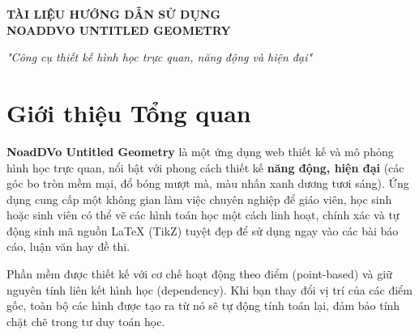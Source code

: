\documentclass[12pt,a4paper]{article}
\date{}
\begin{document}

\begin{center}
    \vspace*{2cm}
    {\Huge \textbf{\color{dark} TÀI LIỆU HƯỚNG DẪN SỬ DỤNG}}\\[0.5cm]
    {\Huge \textbf{\color{primary} NOADDVO UNTITLED GEOMETRY}}\\[1.5cm]
    
    \begin{infobox}
    \centering
    \textit{"Công cụ thiết kế hình học trực quan, năng động và hiện đại"}
    \end{infobox}
    
    \vspace{2cm}
\end{center}

\tableofcontents

\newpage

\section{Giới thiệu Tổng quan}
\textbf{NoadDVo Untitled Geometry} là một ứng dụng web thiết kế và mô phỏng hình học trực quan, nổi bật với phong cách thiết kế \textbf{năng động, hiện đại} (các góc bo tròn mềm mại, đổ bóng mượt mà, màu nhấn xanh dương tươi sáng). Ứng dụng cung cấp một không gian làm việc chuyên nghiệp để giáo viên, học sinh hoặc sinh viên có thể vẽ các hình toán học một cách linh hoạt, chính xác và tự động sinh mã nguồn LaTeX (TikZ) tuyệt đẹp để sử dụng ngay vào các bài báo cáo, luận văn hay đề thi.

Phần mềm được thiết kế với cơ chế hoạt động theo điểm (point-based) và giữ nguyên tính liên kết hình học (dependency). Khi bạn thay đổi vị trí của các điểm gốc, toàn bộ các hình được tạo ra từ nó sẽ tự động tính toán lại, đảm bảo tính chặt chẽ trong tư duy toán học.
\end{document}
